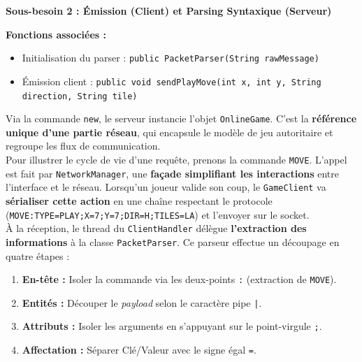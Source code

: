 \documentclass[a4paper]{article}
\begin{document}
\begin{besoinbox}
    \textbf{\large Sous-besoin 2 : Émission (Client) et Parsing Syntaxique (Serveur)}
    
    \vspace{2mm}
    \textbf{Fonctions associées :}
    \begin{itemize}
        \item Initialisation du parser : \texttt{public PacketParser(String rawMessage)}
        \item Émission client : \texttt{public void sendPlayMove(int x, int y, String direction, String tile)}
    \end{itemize}
    \vspace{2mm}

    Via la commande \texttt{new}, le serveur instancie l'objet \texttt{OnlineGame}. C’est la \textbf{référence unique d’une partie réseau}, qui encapsule le modèle de jeu autoritaire et regroupe les flux de communication.\\

    Pour illustrer le cycle de vie d'une requête, prenons la commande \texttt{MOVE}. L'appel est fait par \texttt{NetworkManager}, une \textbf{façade simplifiant les interactions} entre l'interface et le réseau. 
    Lorsqu'un joueur valide son coup, le \texttt{GameClient} va \textbf{sérialiser cette action} en une chaîne respectant le protocole (\texttt{MOVE:TYPE=PLAY;X=7;Y=7;DIR=H;TILES=LA}) et l’envoyer sur le socket.\\

    À la réception, le thread du \texttt{ClientHandler} délègue \textbf{l’extraction des informations} à la classe \texttt{PacketParser}. Ce parseur effectue un découpage en quatre étapes :
    \begin{enumerate}
        \item \textbf{En-tête :} Isoler la commande via les deux-points \texttt{:} (extraction de \texttt{MOVE}).
        \item \textbf{Entités :} Découper le \textit{payload} selon le caractère pipe \texttt{|}.
        \item \textbf{Attributs :} Isoler les arguments en s'appuyant sur le point-virgule \texttt{;}.
        \item \textbf{Affectation :} Séparer Clé/Valeur avec le signe égal \texttt{=}.
    \end{enumerate}
\end{besoinbox}
\end{document}
